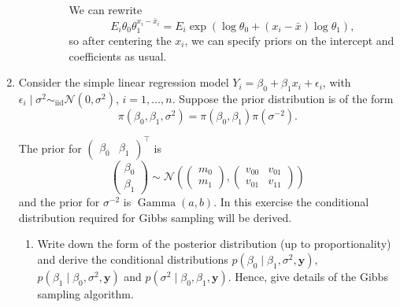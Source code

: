 \documentclass[letterpaper,11pt]{article}
\begin{document}
\begin{enumerate}
\begin{enumerate}
\begin{description}
      We can rewrite
      \begin{equation}
        E_i\theta_0\theta_1^{x_i - \bar{x}_i} = E_i\exp\left(
          \log\theta_0 + \left(x_i - \bar{x}\right)\log\theta_1
        \right),
      \end{equation}
      so after centering the $x_i$, we can specify priors on the intercept and
      coefficients as usual.
    \end{description}
  \end{enumerate}
\item Consider the simple linear regression model
  $Y_i = \beta_0 + \beta_1x_i + \epsilon_i$, with
  $\epsilon_i \mid \sigma^2 \sim_\mathrm{iid} \mathcal{N}\left(0,
    \sigma^2\right)$, $i = 1,\ldots, n$. Suppose the prior distribution is of the
  form
  \begin{equation}
    \pi\left(\beta_0,\beta_1,\sigma^2\right) = \pi\left(\beta_0,\beta_1\right)
    \pi\left(\sigma^{-2}\right).
  \end{equation}

  The prior for $\begin{pmatrix}\beta_0 & \beta_1\end{pmatrix}^\intercal$ is
  \begin{equation}
    \begin{pmatrix}
      \beta_0 \\ \beta_1
    \end{pmatrix} \sim
    \mathcal{N}\left(
      \begin{pmatrix}
        m_0 \\ m_1
      \end{pmatrix},
      \begin{pmatrix}
        v_{00} & v_{01} \\ v_{01} & v_{11}
      \end{pmatrix} 
    \right)
  \end{equation}
  and the prior for $\sigma^{-2}$ is $\operatorname{Gamma}\left(a, b\right)$. In
  this exercise the conditional distribution required for Gibbs sampling will be
  derived.

  \begin{enumerate}
  \item Write down the form of the posterior distribution (up to
    proportionality) and derive the conditional distributions
    $p\left(\beta_0 \mid \beta_1, \sigma^2, \mathbf{y}\right)$,
    $p\left(\beta_1 \mid \beta_0, \sigma^2, \mathbf{y}\right)$ and
    $p\left(\sigma^2 \mid \beta_0, \beta_1, \mathbf{y}\right)$. Hence, give details of the
    Gibbs sampling algorithm.


\end{enumerate}
\end{enumerate}
\end{document}
